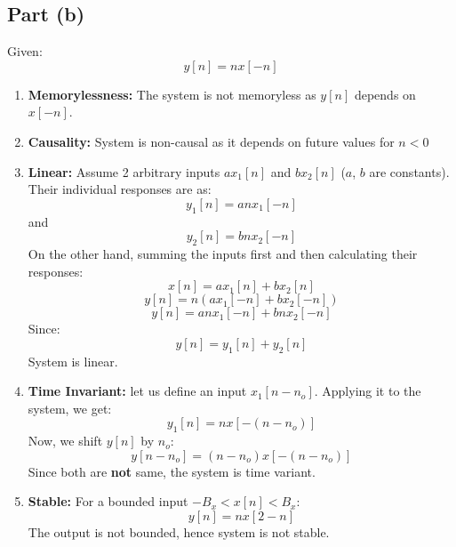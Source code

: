 \documentclass[12pt,letterpaper]{article}
\begin{document}
\subsection*{Part (b)}
Given:
    \[
    y[n] = nx[-n]
    \]
\begin{enumerate}
    \item \textbf{Memorylessness:} The system is not memoryless as $y[n]$ depends on $x[-n]$. 
    \item \textbf{Causality:}
    System is non-causal as it depends on future values for $n<0$
    \item \textbf{Linear:} Assume 2 arbitrary inputs $a x_1[n]$ and $bx_2[n]$ ($a$, $b$ are constants). Their individual responses are as:
    \[
    y_1[n] = a n x_1[-n]
    \]
    and 
    \[
    y_2[n] = b n x_2[-n]
    \]
    On the other hand, summing the inputs first and then calculating their responses:
    \[
    x[n] = a x_1[n] + b x_2[n]
    \]
    \[
        y[n] = n (a x_1[-n] + b x_2[-n])
    \]
    \[
        y[n] = a n x_1[-n] + b n x_2[-n]
    \]
    Since: 
    \[
        y[n] = y_1[n] + y_2[n]
    \]
    System is linear. 
    
    \item \textbf{Time Invariant:}
    let us define an input $x_1[n-n_o]$. Applying it to the system, we get: 
    \[
        y_1[n] = n x[-(n-n_o)]
    \]
    Now, we shift $y[n]$ by $n_o$:
    \[
        y[n-n_o] = (n-n_o)x[- (n-n_o)]
    \]
    Since both are \textbf{not} same, the system is time variant. 
    
    \item \textbf{Stable:} For a bounded input $-B_x<x[n]<B_x$: 
    \[
        y[n] = n x[2-n]
    \]
    The output is not bounded, hence system is not stable. 
    
\end{enumerate}
\pagebreak
\end{document}
